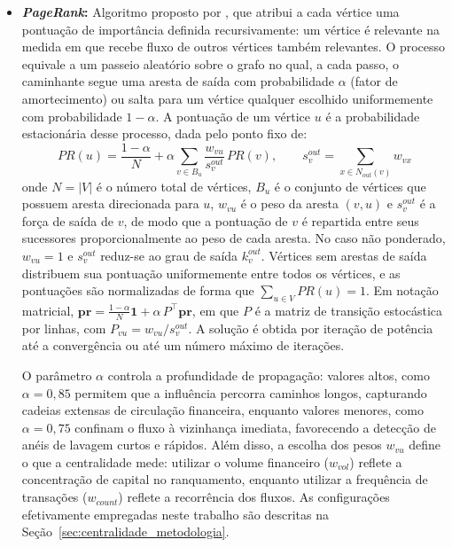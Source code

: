 \documentclass[titlepage,a4paper,oneside,onecolumn,12pt]{report}
\begin{document}
\begin{itemize}
\item \textbf{\textit{PageRank}:} Algoritmo proposto por , que atribui a cada vértice uma pontuação de importância definida recursivamente: um vértice é relevante na medida em que recebe fluxo de outros vértices também relevantes. O processo equivale a um passeio aleatório sobre o grafo no qual, a cada passo, o caminhante segue uma aresta de saída com probabilidade $\alpha$ (fator de amortecimento) ou salta para um vértice qualquer escolhido uniformemente com probabilidade $1-\alpha$. A pontuação de um vértice $u$ é a probabilidade estacionária desse processo, dada pelo ponto fixo de:
\begin{equation}
    PR(u) = \frac{1-\alpha}{N} + \alpha \sum_{v \in B_u} \frac{w_{vu}}{s_v^{out}} \, PR(v), \qquad s_v^{out} = \sum_{x \in N_{out}(v)} w_{vx}
\end{equation}
onde $N = |V|$ é o número total de vértices, $B_u$ é o conjunto de vértices que possuem aresta direcionada para $u$, $w_{vu}$ é o peso da aresta $(v,u)$ e $s_v^{out}$ é a força de saída de $v$, de modo que a pontuação de $v$ é repartida entre seus sucessores proporcionalmente ao peso de cada aresta. No caso não ponderado, $w_{vu}=1$ e $s_v^{out}$ reduz-se ao grau de saída $k_v^{out}$. Vértices sem arestas de saída distribuem sua pontuação uniformemente entre todos os vértices, e as pontuações são normalizadas de forma que $\sum_{u \in V} PR(u) = 1$. Em notação matricial, $\mathbf{pr} = \frac{1-\alpha}{N}\mathbf{1} + \alpha \, P^{\top}\mathbf{pr}$, em que $P$ é a matriz de transição estocástica por linhas, com $P_{vu} = w_{vu}/s_v^{out}$. A solução é obtida por iteração de potência até a convergência ou até um número máximo de iterações.

O parâmetro $\alpha$ controla a profundidade de propagação: valores altos, como $\alpha=0{,}85$ permitem que a influência percorra caminhos longos, capturando cadeias extensas de circulação financeira, enquanto valores menores, como $\alpha=0{,}75$ confinam o fluxo à vizinhança imediata, favorecendo a detecção de anéis de lavagem curtos e rápidos. Além disso, a escolha dos pesos $w_{vu}$ define o que a centralidade mede: utilizar o volume financeiro ($w_{vol}$) reflete a concentração de capital no ranquamento, enquanto utilizar a frequência de transações ($w_{count}$) reflete a recorrência dos fluxos. As configurações efetivamente empregadas neste trabalho são descritas na Seção~\ref{sec:centralidade_metodologia}.


\end{itemize}
\end{document}
